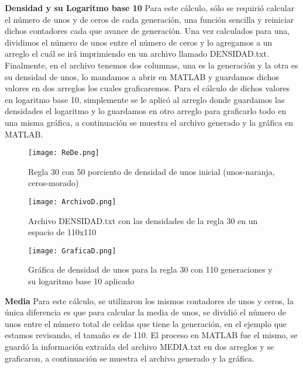 \documentclass{article}
\begin{document}
	\textbf{Densidad y su Logaritmo base 10}
	\newline
	Para este cálculo, sólo se requirió calcular el número de unos y de ceros de cada generación, una función sencilla y reiniciar dichos contadores cada que avance de generación. Una vez calculados para una, dividimos el número de unos entre el número de ceros y lo agregamos a un arreglo el cuál se irá imprimiendo en un archivo llamado DENSIDAD.txt.
	Finalmente, en el archivo tenemos dos columnas, una es la generación y la otra es su densidad de unos, lo mandamos a abrir en MATLAB y guardamos dichos valores en dos arreglos los cuales graficaremos.
	Para el cálculo de dichos valores en logaritmo base 10, simplemente se le aplicó al arreglo donde guardamos las densidades el logaritmo y lo guardamos en otro arreglo para graficarlo todo en una misma gráfica, a continuación se muestra el archivo generado y la gráfica en MATLAB. 
	
	\begin{figure}[h]
		\centering       
		\texttt{[image: ReDe.png]}
		\caption{Regla 30 con 50 porciento de densidad de unos inicial (unos-naranja, ceros-morado)}
		\label{fig:mi_imagen1}
	\end{figure}
	\vspace{300pt}
		\begin{figure}[h]
		\centering       
		\texttt{[image: ArchivoD.png]}
		\caption{Archivo DENSIDAD.txt con las densidades de la regla 30 en un espacio de 110x110}
		\label{fig:mi_imagen1}
	\end{figure}
	
		\begin{figure}[h]
		\centering       
		\texttt{[image: GraficaD.png]}
		\caption{Gráfica de densidad de unos para la regla 30 con 110 generaciones y su logaritmo base 10 aplicado}
		\label{fig:mi_imagen1}
	\end{figure}
	
	\textbf{Media}
	\newline
	\newline
	Para este cálculo, se utilizaron los mismos contadores de unos y ceros, la única diferencia es que para calcular la media de unos, se dividió el número de unos entre el número total de celdas que tiene la generación, en el ejemplo que estamos revisando, el tamaño es de 110. 
	El proceso en MATLAB fue el mismo, se guardó la información extraída del archivo MEDIA.txt en dos arreglos y se graficaron, a continuación se muestra el archivo generado y la gráfica.
	
\end{document}
